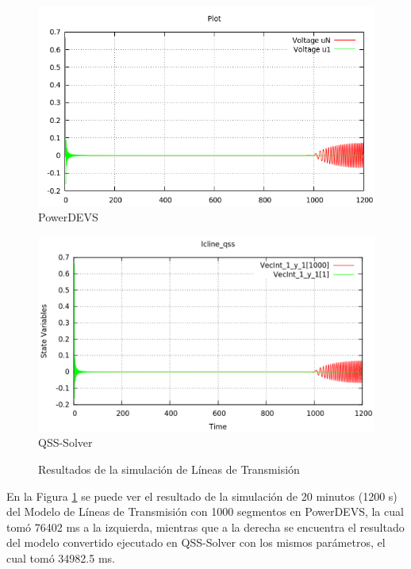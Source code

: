 \begin{figure}[H]
\centering
\begin{minipage}{0.5\textwidth}
\includegraphics[width=\linewidth]{lcline-pd.png}
\centering
PowerDEVS\\
\end{minipage}\hfill
\begin{minipage}{0.5\textwidth}
 \includegraphics[width=\linewidth]{lcline-qss.png}
\centering
QSS-Solver\\
\end{minipage}
\caption{Resultados de la simulación de Líneas de Transmisión}
\label{graph:lclines}
\end{figure}

En la Figura \ref{graph:lclines} se puede ver el resultado de la simulación de 20 minutos (1200 s) del Modelo de Líneas de Transmisión con 1000 segmentos en PowerDEVS,
	la cual tomó 76402 ms a la izquierda, mientras que a la derecha se encuentra el resultado del modelo convertido ejecutado en QSS-Solver con los mismos 
	parámetros, el cual tomó 34982.5 ms.

